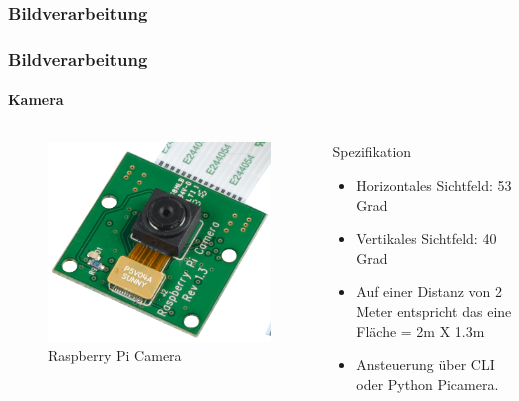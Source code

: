 \subsubsection{Bildverarbeitung}
\begin{frame}
	\frametitle{Bildverarbeitung\hfill{}\footnotesize \group}
	\framesubtitle{Kamera}
	
	\begin{columns}
		\begin{column}{0.5\textwidth}
			\begin{figure}
				\centering
				\includegraphics[width=1\textwidth]{../../fig/raspberry_pi_cropped.png}
				\caption{Raspberry Pi Camera}
			\end{figure}
		\end{column}
		
		\begin{column}{0.5\textwidth}
			\begin{block}{Spezifikation}
				\begin{itemize}
					\item Horizontales Sichtfeld: 53 Grad
					\item Vertikales Sichtfeld: 40 Grad
					\item Auf einer Distanz von 2 Meter entspricht das eine Fläche = 2m X 1.3m
					\item Ansteuerung über CLI oder Python Picamera.
				\end{itemize}
			\end{block}
		\end{column}
		

\end{columns}
\end{frame}
